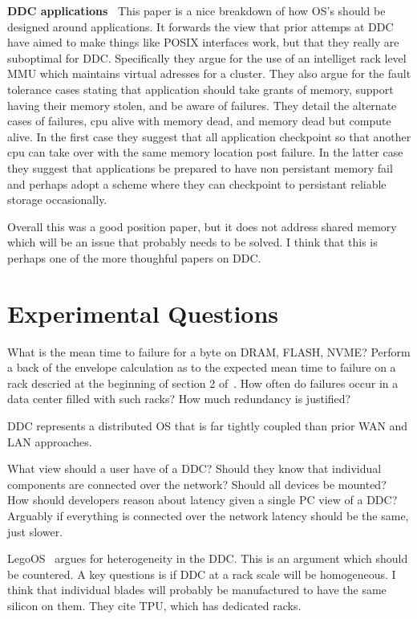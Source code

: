 \textbf{DDC applications~\cite{254120}} This paper is a nice breakdown of how
OS's should be designed around applications. It forwards the view that prior
attemps at DDC have aimed to make things like POSIX interfaces work, but that
they really are suboptimal for DDC. Specifically they argue for the use of an
intelliget rack level MMU which maintains virtual adresses for a cluster.
They also argue for the fault tolerance cases stating that application should
take grants of memory, support having their memory stolen, and be aware of
failures. They detail the alternate cases of failures, cpu alive with memory
dead, and memory dead but compute alive. In the first case they suggest that
all application checkpoint so that another cpu can take over with the same
memory location post failure. In the latter case they suggest that
applications be prepared to have non persistant memory fail and perhaps adopt
a scheme where they can checkpoint to persistant reliable storage
occasionally.

Overall this was a good position paper, but it does not address shared memory
which will be an issue that probably needs to be solved. I think that this is
perhaps one of the more thoughful papers on DDC. 


\section{Experimental Questions}
\label{sec:experiment}

What is the mean time to failure for a byte on DRAM, FLASH, NVME? Perform a
back of the envelope calculation as to the expected mean time to failure on a
rack descried at the beginning of section 2 of~\cite{189914}. How often do
failures occur in a data center filled with such racks? How much redundancy is
justified?

DDC represents a distributed OS that is far tightly coupled than prior WAN and
LAN approaches.

What view should a user have of a DDC? Should they know that individual
components are connected over the network? Should all devices be mounted? How
should developers reason about latency given a single PC view of a DDC?
Arguably if everything is connected over the network latency should be the
same, just slower.

LegoOS~\cite{legoos} argues for heterogeneity in the DDC. This is an argument
which should be countered. A key questions is if DDC at a rack scale will be
homogeneous. I think that individual blades will probably be manufactured to
have the same silicon on them. They cite TPU, which has dedicated racks.

